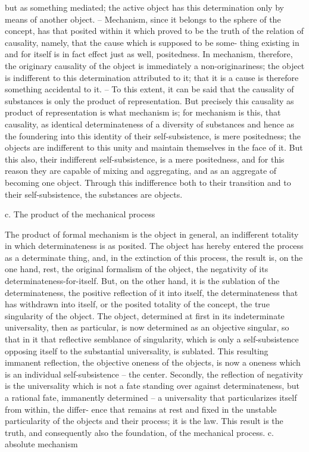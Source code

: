but as something mediated; the active object has this determination only
by means of another object. – Mechanism, since it belongs to the sphere of
the concept, has that posited within it which proved to be the truth of the
relation of causality, namely, that the cause which is supposed to be some-
thing existing in and for itself is in fact effect just as well, positedness. In
mechanism, therefore, the originary causality of the object is immediately a
non-originariness; the object is indifferent to this determination attributed
to it; that it is a cause is therefore something accidental to it. – To this
extent, it can be said that the causality of substances is only the product
of representation. But precisely this causality as product of representation
is what mechanism is; for mechanism is this, that causality, as identical
determinateness of a diversity of substances and hence as the foundering
into this identity of their self-subsistence, is mere positedness; the objects
are indifferent to this unity and maintain themselves in the face of it. But
this also, their indifferent self-subsistence, is a mere positedness, and for this
reason they are capable of mixing and aggregating, and as an aggregate of
becoming one object. Through this indifference both to their transition and
to their self-subsistence, the substances are objects.

c. The product of the mechanical process

The product of formal mechanism is the object in general, an indifferent
totality in which determinateness is as posited. The object has hereby entered
the process as a determinate thing, and, in the extinction of this process,
the result is, on the one hand, rest, the original formalism of the object, the
negativity of its determinateness-for-itself. But, on the other hand, it is the
sublation of the determinateness, the positive reflection of it into itself, the
determinateness that has withdrawn into itself, or the posited totality of the
concept, the true singularity of the object. The object, determined at first in
its indeterminate universality, then as particular, is now determined as an
objective singular, so that in it that reflective semblance of singularity, which
is only a self-subsistence opposing itself to the substantial universality, is
sublated.
This resulting immanent reflection, the objective oneness of the objects,
is now a oneness which is an individual self-subsistence – the center.
Secondly, the reflection of negativity is the universality which is not a
fate standing over against determinateness, but a rational fate, immanently
determined – a universality that particularizes itself from within, the differ-
ence that remains at rest and fixed in the unstable particularity of the objects
and their process; it is the law. This result is the truth, and consequently
also the foundation, of the mechanical process.
c. absolute mechanism

